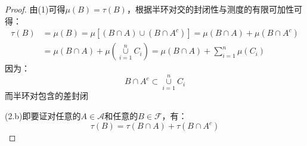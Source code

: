 \begin{proof}
	由(1)可得$\mu(B)=\tau(B)$，根据半环对交的封闭性与测度的有限可加性可得：
	\begin{align*}
		\tau(B)&=\mu(B)=\mu[(B\cap A)\cup (B\cap A^c)]=\mu(B\cap A)+\mu(B\cap A^c) \\
		&=\mu(B\cap A)+\mu\left(\underset{i=1}{\overset{n}{\cup}}C_i\right)=\mu(B\cap A)+\sum_{i=1}^{n}\mu(C_i)
	\end{align*}
	因为：
	\begin{equation*}
		B\cap A^c\subset\underset{i=1}{\overset{n}{\cup}}C_i
	\end{equation*}
	而半环对包含的差封闭\par
	(2.b)即要证对任意的$A\in \mathscr{A}$和任意的$B\in \mathscr{F}$，有：
	\begin{equation*}
		\tau(B)=\tau(B\cap A)+\tau(B\cap A^c)
	\end{equation*}
\end{proof}